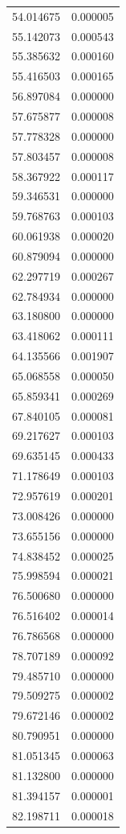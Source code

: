\begin{longtable}{rr}
54.014675 & 0.000005 \\
55.142073 & 0.000543 \\
55.385632 & 0.000160 \\
55.416503 & 0.000165 \\
56.897084 & 0.000000 \\
57.675877 & 0.000008 \\
57.778328 & 0.000000 \\
57.803457 & 0.000008 \\
58.367922 & 0.000117 \\
59.346531 & 0.000000 \\
59.768763 & 0.000103 \\
60.061938 & 0.000020 \\
60.879094 & 0.000000 \\
62.297719 & 0.000267 \\
62.784934 & 0.000000 \\
63.180800 & 0.000000 \\
63.418062 & 0.000111 \\
64.135566 & 0.001907 \\
65.068558 & 0.000050 \\
65.859341 & 0.000269 \\
67.840105 & 0.000081 \\
69.217627 & 0.000103 \\
69.635145 & 0.000433 \\
71.178649 & 0.000103 \\
72.957619 & 0.000201 \\
73.008426 & 0.000000 \\
73.655156 & 0.000000 \\
74.838452 & 0.000025 \\
75.998594 & 0.000021 \\
76.500680 & 0.000000 \\
76.516402 & 0.000014 \\
76.786568 & 0.000000 \\
78.707189 & 0.000092 \\
79.485710 & 0.000000 \\
79.509275 & 0.000002 \\
79.672146 & 0.000002 \\
80.790951 & 0.000000 \\
81.051345 & 0.000063 \\
81.132800 & 0.000000 \\
81.394157 & 0.000001 \\
82.198711 & 0.000018 \\

\end{longtable}
